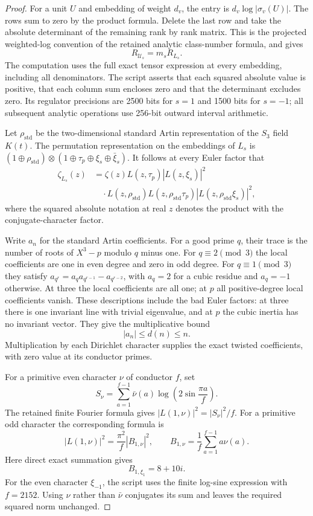 \begin{proof}
For a unit $U$ and embedding of weight $d_v$, the entry is
$d_v\log|\sigma_v(U)|$.
The rows sum to zero by the product formula.
Delete the last row and take the absolute determinant of the
remaining rank by rank matrix.
This is the projected weighted-log convention of the retained
analytic class-number formula, and gives
\[
                       R_{\mathcal U_s}=m_sR_{L_s}.
 \tag{Q8QC.15}
\]
The computation uses the full exact tensor expression at every
embedding, including all denominators.
The script asserts that each squared absolute value is positive,
that each column sum encloses zero and that the determinant
excludes zero.
Its regulator precisions are 2500 bits for $s=1$ and
1500 bits for $s=-1$; all subsequent analytic operations use
256-bit outward interval arithmetic.

Let $\rho_{\mathrm{std}}$ be the two-dimensional standard Artin
representation of the $S_3$ field $K(t)$.
The permutation representation on the embeddings of $L_s$
is
$(1\oplus\rho_{\mathrm{std}})\otimes
 (1\oplus\tau_p\oplus\xi_s\oplus\bar\xi_s)$.
It follows at every Euler factor that
\[
 \begin{aligned}
 \zeta_{L_s}(z)&=\zeta(z)L(z,\tau_p)|L(z,\xi_s)|^2\\
       &\quad\cdot L(z,\rho_{\mathrm{std}})
       L(z,\rho_{\mathrm{std}}\tau_p)
       |L(z,\rho_{\mathrm{std}}\xi_s)|^2 ,
 \end{aligned}
 \tag{Q8QC.16}
\]
where the squared absolute notation at real $z$ denotes the
product with the conjugate-character factor.

Write $a_n$ for the standard Artin coefficients.
For a good prime $q$, their trace is the number of roots of
$X^3-p$ modulo $q$ minus one.
For $q\equiv2\pmod3$ the local coefficients are one in even
degree and zero in odd degree.
For $q\equiv1\pmod3$ they satisfy
$a_{q^r}=a_q a_{q^{r-1}}-a_{q^{r-2}}$, with $a_q=2$ for
a cubic residue and $a_q=-1$ otherwise.
At three the local coefficients are all one; at $p$ all
positive-degree local coefficients vanish.
These descriptions include the bad Euler factors: at three
there is one invariant line with trivial eigenvalue, and
at $p$ the cubic inertia has no invariant vector.
They give the multiplicative bound
\[
                              |a_n|\leq d(n)\leq n.
 \tag{Q8QC.17}
\]
Multiplication by each Dirichlet character supplies the exact
twisted coefficients, with zero value at its conductor primes.

For a primitive even character $\nu$ of conductor $f$, set
\[
       S_\nu=\sum_{a=1}^{f-1}\bar\nu(a)
                     \log\left(2\sin\frac{\pi a}{f}\right).
\]
The retained finite Fourier formula gives
$|L(1,\nu)|^2=|S_\nu|^2/f$.
For a primitive odd character the corresponding formula is
\[
 |L(1,\nu)|^2=\frac{\pi^2}{f}|B_{1,\nu}|^2,\qquad
 B_{1,\nu}=\frac1f\sum_{a=1}^{f-1}a\nu(a).
 \tag{Q8QC.18}
\]
Here direct exact summation gives
\[
                       B_{1,\xi_1}=8+10i.
 \tag{Q8QC.19}
\]
For the even character $\xi_{-1}$, the script uses the finite
log-sine expression with $f=2152$.
Using $\nu$ rather than $\bar\nu$ conjugates its sum and leaves
the required squared norm unchanged.


\end{proof}
